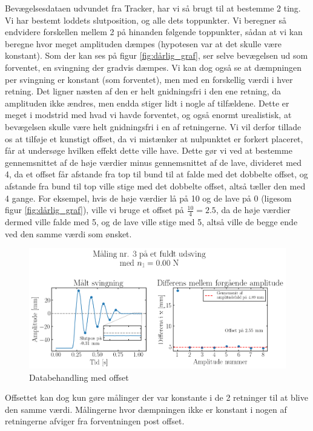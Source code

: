 Bevægelsesdataen udvundet fra Tracker, har vi så brugt til at bestemme 2 ting. Vi har bestemt loddets slutposition, og alle dets toppunkter. 
Vi beregner så endvidere forskellen mellem 2 på hinanden følgende toppunkter, sådan at vi kan beregne hvor meget amplituden dæmpes (hypotesen var at det skulle være konstant).
Som der kan ses på figur \ref{fig:dårlig_graf}, ser selve bevægelsen ud som forventet, en svingning der gradvis dæmpes. 
Vi kan dog også se at dæmpningen per svingning er konstant (som forventet), men med en forskellig værdi i hver retning. 
Det ligner næsten af den er helt gnidningsfri i den ene retning, da amplituden ikke ændres, men endda stiger lidt i nogle af tilfældene.
Dette er meget i modstrid med hvad vi havde forventet, og også enormt urealistisk, at bevægelsen skulle være helt gnidningsfri i en af retningerne. 
Vi vil derfor tillade os at tilføje et kunstigt offset, da vi mistænker at nulpunktet er forkert placeret, får at undersøge hvilken effekt dette ville have. 
Dette gør vi ved at bestemme gennemsnittet af de høje værdier minus gennemsnittet af de lave, divideret med 4, da et offset får afstande fra top til bund til at falde med det dobbelte offset, 
og afstande fra bund til top ville stige med det dobbelte offset, altså tæller den med 4 gange. For eksempel, hvis de høje værdier lå på 10 og de lave på 0 (ligesom figur \ref{fig:dårlig_graf}),
ville vi bruge et offset på $\frac{10}{4}=2.5$, da de høje værdier dermed ville falde med 5, og de lave ville stige med 5, altså ville de begge ende ved den samme værdi som ønsket.

\begin{figure}[htbp]
    \centering
    \includegraphics[width=0.8\linewidth,origin=c]{figures/n0.00-maks3.png}
    \caption{Databehandling med offset}
    \label{fig:offset_graf}

\end{figure}

\noindent
Offsettet kan dog kun gøre målinger der var konstante i de 2 retninger til at blive den samme værdi. 
Målingerne hvor dæmpningen ikke er konstant i nogen af retningerne afviger fra forventningen post offset.

